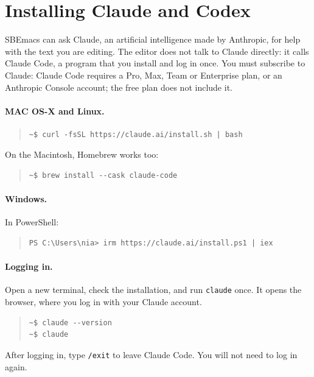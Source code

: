 \documentclass[a4paper,12pt,openany]{book}
\begin{document}
\section{Installing Claude and Codex}

SBEmacs can ask Claude, an artificial intelligence made by
Anthropic, for help with the text you are editing. The editor does
not talk to Claude directly: it calls Claude Code, a program that
you install and log in once. You must subscribe to Claude: Claude Code
requires a Pro, Max, Team or Enterprise plan, or an Anthropic
Console account; the free plan does not include it.

\paragraph{MAC OS-X and Linux.}
\begin{quote}
\begin{verbatim}
~$ curl -fsSL https://claude.ai/install.sh | bash
\end{verbatim}
\end{quote}
On the Macintosh, Homebrew works too:
\begin{quote}
\begin{verbatim}
~$ brew install --cask claude-code
\end{verbatim}
\end{quote}

\paragraph{Windows.} In PowerShell:
\begin{quote}
\begin{verbatim}
PS C:\Users\nia> irm https://claude.ai/install.ps1 | iex
\end{verbatim}
\end{quote}

\paragraph{Logging in.} Open a new terminal, check the
installation, and run \verb|claude| once. It opens the browser, where
you log in with your Claude account.
\begin{quote}
\begin{verbatim}
~$ claude --version
~$ claude
\end{verbatim}
\end{quote}
After logging in, type \verb|/exit| to leave Claude Code. You will not
need to log in again.
\end{document}
